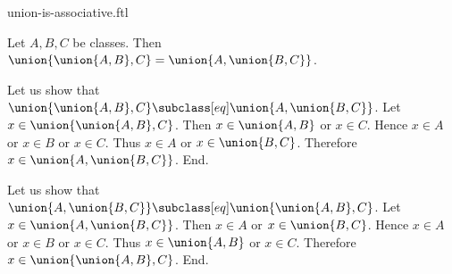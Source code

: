 \documentclass{article}
\begin{document}
\begin{smodule}[creators={Marcel Schütz}]{union-is-associative.ftl}

  \begin{fproposition*}[label=5573070641168384]
    Let $A, B, C$ be classes.
    Then $\union{\union{A,B},C} = \union{A,\union{B,C}}$.
  \end{fproposition*}
  \begin{fproof}
    Let us show that $\union{\union{A,B},C} \subclass[eq] \union{A,\union{B,C}}$.
      Let $x \in \union{\union{A,B},C}$.
      Then $x \in \union{A,B}$ or $x \in C$.
      Hence $x \in A$ or $x \in B$ or $x \in C$.
      Thus $x \in A$ or $x \in \union{B,C}$.
      Therefore $x \in \union{A,\union{B,C}}$.
    End.

    Let us show that $\union{A,\union{B,C}} \subclass[eq] \union{\union{A,B},C}$.
      Let $x \in \union{A,\union{B,C}}$.
      Then $x \in A$ or $x \in \union{B,C}$.
      Hence $x \in A$ or $x \in B$ or $x \in C$.
      Thus $x \in \union{A,B}$ or $x \in C$.
      Therefore $x \in \union{\union{A,B},C}$.
    End.
  \end{fproof}
\end{smodule}
\end{document}
